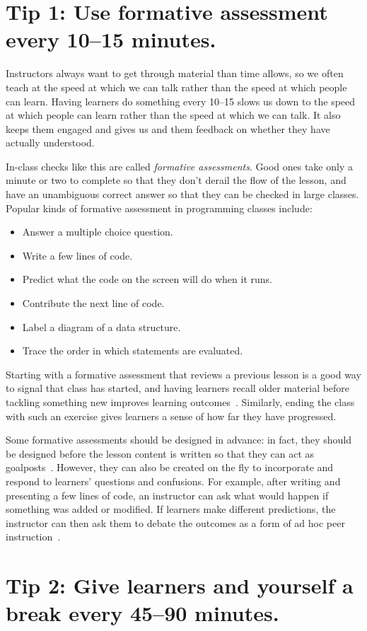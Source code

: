 \documentclass[10pt,letterpaper]{article}
\newcommand{\rulemajor}[1]{\section{#1}}
\begin{document}
\rulemajor{Tip 1: Use formative assessment every 10--15 minutes.}

Instructors always want to get through material than time allows,
so we often teach at the speed at which we can talk
rather than the speed at which people can learn.
Having learners do something every 10--15 slows us down to the speed at which people can learn
rather than the speed at which we can talk.
It also keeps them engaged
and gives us and them feedback on whether they have actually understood.

In-class checks like this are called \emph{formative assessments}.
Good ones take only a minute or two to complete so that they don't derail the flow of the lesson,
and have an unambiguous correct answer so that they can be checked in large classes.
Popular kinds of formative assessment in programming classes include:

\begin{itemize}
  \item Answer a multiple choice question.
  \item Write a few lines of code.
  \item Predict what the code on the screen will do when it runs.
  \item Contribute the next line of code.
  \item Label a diagram of a data structure.
  \item Trace the order in which statements are evaluated.
\end{itemize}

Starting with a formative assessment that reviews a previous lesson
is a good way to signal that class has started,
and having learners recall older material before tackling something new
improves learning outcomes~\cite{Wein2018b}.
Similarly,
ending the class with such an exercise
gives learners a sense of how far they have progressed.

Some formative assessments should be designed in advance:
in fact,
they should be designed before the lesson content is written
so that they can act as goalposts~\cite{Wils2019}.
However,
they can also be created on the fly to incorporate and respond to learners' questions and confusions.
For example,
after writing and presenting a few lines of code,
an instructor can ask what would happen if something was added or modified.
If learners make different predictions,
the instructor can then ask them to debate the outcomes
as a form of ad hoc peer instruction~\cite{Brow2018}.

\rulemajor{Tip 2: Give learners and yourself a break every 45--90 minutes.}
\end{document}

